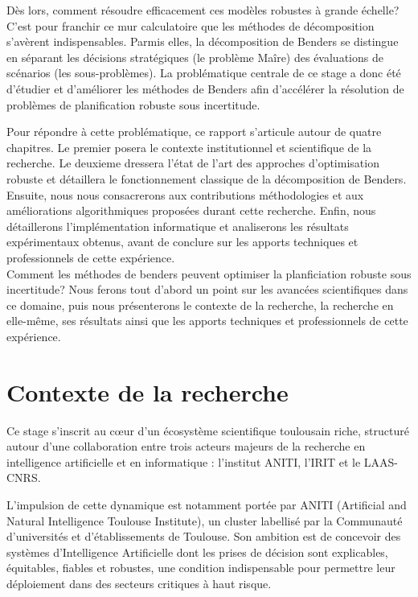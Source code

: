 \documentclass[12pt, a4paper, twoside]{report}
\begin{document}
Dès lors, comment résoudre efficacement ces modèles robustes à grande échelle? C'est pour franchir ce mur calculatoire que les méthodes de décomposition s'avèrent indispensables. Parmis elles, la décomposition de Benders se distingue en séparant les décisions stratégiques (le problème Maîre) des évaluations de scénarios (les sous-problèmes).
La problématique centrale de ce stage a donc été d'étudier et d'améliorer les méthodes de Benders afin d'accélérer la résolution de problèmes de planification robuste sous incertitude. 

Pour répondre à cette problématique, ce rapport s'articule autour de quatre chapitres. Le premier posera le contexte institutionnel et scientifique de la recherche. Le deuxieme dressera l'état de l'art des approches d'optimisation robuste et détaillera le fonctionnement classique de la décomposition de Benders.
Ensuite, nous nous consacrerons aux contributions méthodologies et aux améliorations algorithmiques proposées durant cette recherche.
Enfin, nous détaillerons l'implémentation informatique et analiserons les résultats expérimentaux obtenus, avant de conclure sur les apports techniques et professionnels de cette expérience.\\




Comment les méthodes de benders peuvent optimiser la planficiation robuste sous incertitude?
Nous ferons tout d'abord un point sur les avancées scientifiques dans ce domaine, puis nous présenterons le contexte de la recherche, la recherche en elle-même, ses résultats ainsi que les apports techniques et professionnels de cette expérience.

\clearpage
\section{Contexte de la recherche}

Ce stage s'inscrit au cœur d'un écosystème scientifique toulousain riche, structuré autour d'une collaboration entre trois acteurs majeurs de la recherche en intelligence artificielle et en informatique : l'institut ANITI, l'IRIT et le LAAS-CNRS.

L'impulsion de cette dynamique est notamment portée par ANITI (Artificial and Natural Intelligence Toulouse Institute), un cluster labellisé par la Communauté d'universités et d'établissements de Toulouse. Son ambition est de concevoir des systèmes d'Intelligence Artificielle dont les prises de décision sont explicables, équitables, fiables et robustes, une condition indispensable pour permettre leur déploiement dans des secteurs critiques à haut risque.
\end{document}
